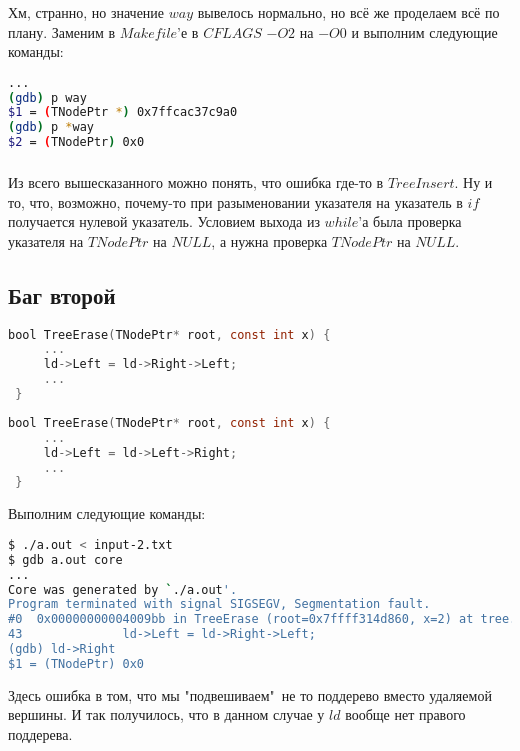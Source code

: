 \documentclass[12pt]{article}
\begin{document}
\subsubsection{}
Хм, странно, но значение $way$ вывелось нормально, но всё же проделаем всё по плану. Заменим в $Makefile$'е в $CFLAGS$ $-O2$ на $-O0$ и выполним следующие команды:
\begin{lstlisting}[language=bash, frame=L]
...
(gdb) p way
$1 = (TNodePtr *) 0x7ffcac37c9a0
(gdb) p *way
$2 = (TNodePtr) 0x0
\end{lstlisting}
\subsubsection{}
Из всего вышесказанного можно понять, что ошибка где-то в $TreeInsert$. Ну и то, что, возможно, почему-то при разыменовании указателя на указатель в $if$ получается нулевой указатель.
\newline
\newline
Условием выхода из $while$'а была проверка указателя на $TNodePtr$ на $NULL$, а нужна проверка $TNodePtr$ на $NULL$.
\newpage
\subsection{Баг второй}
\begin{lstlisting}[language=C, backgroundcolor=\color{myred}]
 bool TreeErase(TNodePtr* root, const int x) {
     ...
     ld->Left = ld->Right->Left;
     ...
 }
\end{lstlisting}
\begin{lstlisting}[language=C, caption=tree.c, captionpos=b, backgroundcolor=\color{mygreen}]
 bool TreeErase(TNodePtr* root, const int x) {
     ...
     ld->Left = ld->Left->Right;
     ...
 }
\end{lstlisting}
Выполним следующие команды:
\begin{lstlisting}[language=bash, frame=L]
$ ./a.out < input-2.txt
$ gdb a.out core
...
Core was generated by `./a.out'.
Program terminated with signal SIGSEGV, Segmentation fault.
#0  0x00000000004009bb in TreeErase (root=0x7ffff314d860, x=2) at tree.c:43
43	            ld->Left = ld->Right->Left;
(gdb) ld->Right
$1 = (TNodePtr) 0x0
\end{lstlisting}
Здесь ошибка в том, что мы "подвешиваем"\ не то поддерево вместо удаляемой вершины. И так получилось, что в данном случае у $ld$ вообще нет правого поддерева.
\newpage
\end{document}
